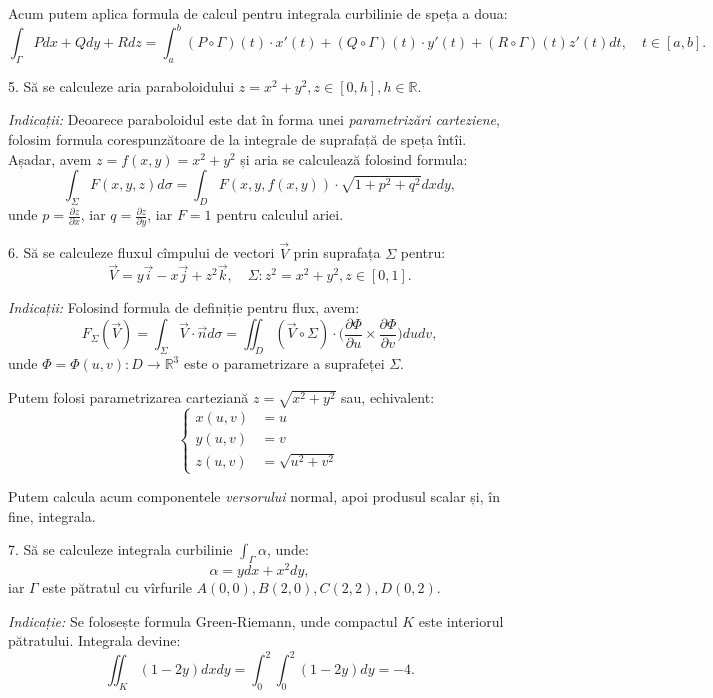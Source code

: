 \documentclass[11pt,a4paper]{article}
\newcommand\ds{\displaystyle}
\newcommand\RR{\mathbb{R}}
\theoremstyle{dotless}
\theoremstyle{dotlessdr}
\begin{document}
Acum putem aplica formula de calcul pentru integrala curbilinie de speța a doua:
\[
  \int_\Gamma Pdx + Qdy + Rdz = \int_a^b (P \circ \Gamma)(t) \cdot x'(t) + (Q\circ \Gamma)(t) \cdot y'(t) +%
  (R \circ \Gamma)(t) z'(t) dt, \quad t \in [a, b].
\]

\vspace{1cm}

5. Să se calculeze aria paraboloidului $z = x^2 + y^2, z \in [0, h], h \in \RR$.

\emph{Indicații:} Deoarece paraboloidul este dat în forma unei \emph{parametrizări carteziene}, folosim
formula corespunzătoare de la integrale de suprafață de speța întîi. Așadar, avem $z = f(x,y) = x^2 + y^2$ și
aria se calculează folosind formula:
\[
  \int_\Sigma F(x, y, z) d\sigma = \int_D F(x, y, f(x, y)) \cdot \sqrt{1 + p^2 + q^2} dxdy,
\]
unde $p = \frac{\partial z}{\partial x}$, iar $q = \frac{\partial z}{\partial y}$, iar $F = 1$ pentru
calculul ariei.

\vspace{1cm}

6. Să se calculeze fluxul cîmpului de vectori $\vec{V}$ prin suprafața $\Sigma$ pentru:
\[
  \vec{V} = y\vec{i} - x\vec{j} + z^2 \vec{k}, \quad
  \Sigma: z^2 = x^2 + y^2, z \in [0,1].
\]

\emph{Indicații:} Folosind formula de definiție pentru flux, avem:
\[
  F_\Sigma(\vec{V}) = \int_\Sigma \vec{V} \cdot \vec{n} d\sigma = %
  \iint_D (\vec{V} \circ \Sigma) \cdot %
  \Big( \frac{\partial \Phi}{\partial u} \times \frac{\partial \Phi}{\partial v} \Big) dudv,
\]
unde $\Phi = \Phi(u, v) : D \to \RR^3$ este o parametrizare a suprafeței $\Sigma$.

Putem folosi parametrizarea carteziană $z = \sqrt{x^2 + y^2}$ sau, echivalent:
\[
  \begin{cases}
    x(u, v) &= u \\
    y(u, v) &= v \\
    z(u, v) &= \sqrt{u^2 + v^2}
  \end{cases}
\]

Putem calcula acum componentele \emph{versorului} normal, apoi produsul scalar și, în fine,
integrala.

\vspace{1cm}

7. Să se calculeze integrala curbilinie $\ds\int_\Gamma \alpha$, unde:
\[
  \alpha = ydx + x^2dy,
\]
iar $\Gamma$ este pătratul cu vîrfurile $A(0, 0), B(2, 0), C(2,2), D(0, 2)$.

\emph{Indicație:} Se folosește formula Green-Riemann, unde compactul $K$ este interiorul pătratului.
Integrala devine:
\[
  \iint_K (1-2y)dxdy = \int_0^2 \int_0^2 (1 - 2y) dy = -4.
\]
\end{document}
